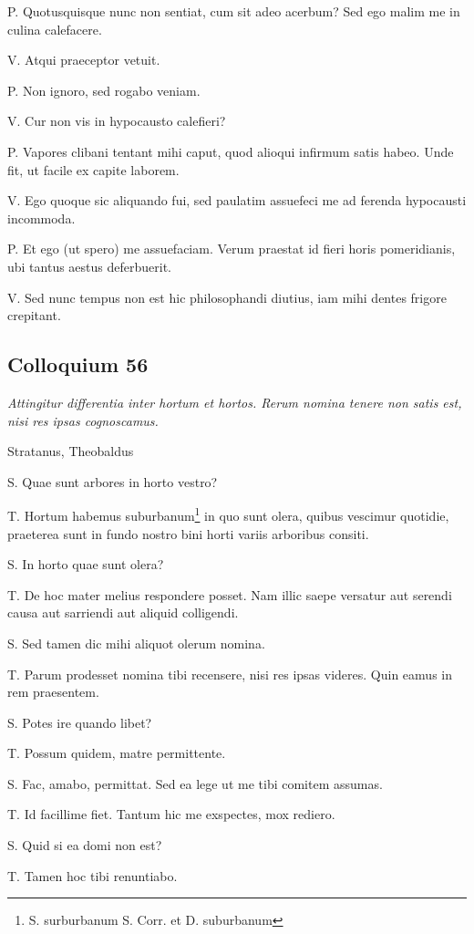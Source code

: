 \documentclass{article}
\begin{document}
P. Quotusquisque nunc non sentiat, cum sit adeo acerbum? Sed ego malim me in culina calefacere. 

V. Atqui praeceptor vetuit. 

P. Non ignoro, sed rogabo veniam. 

V. Cur non vis in hypocausto calefieri?

P. Vapores clibani tentant mihi caput, quod alioqui infirmum satis habeo. Unde fit, ut facile ex capite laborem. 

V. Ego quoque sic aliquando fui, sed paulatim assuefeci me ad ferenda hypocausti incommoda. 

P. Et ego (ut spero) me assuefaciam. Verum praestat id fieri horis pomeridianis, ubi tantus aestus deferbuerit. 

V. Sed nunc tempus non est hic philosophandi diutius, iam mihi dentes frigore crepitant.

\subsection{Colloquium 56}
\emph{Attingitur differentia inter hortum et hortos. Rerum nomina tenere non satis est, nisi res ipsas cognoscamus.}

Stratanus, Theobaldus

S. Quae sunt arbores in horto vestro?

T. Hortum habemus suburbanum\footnote{S. surburbanum S. Corr. et D. suburbanum} in quo sunt olera, quibus vescimur quotidie, praeterea sunt in fundo nostro bini horti variis arboribus consiti. 

S. In horto quae sunt olera?

T. De hoc mater melius respondere posset. Nam illic saepe versatur aut serendi causa aut sarriendi aut aliquid colligendi. 

S. Sed tamen dic mihi aliquot olerum nomina. 

T. Parum prodesset nomina tibi recensere, nisi res ipsas videres. Quin eamus in rem praesentem. 

S. Potes ire quando libet?

T. Possum quidem, matre permittente. 

S. Fac, amabo, permittat. Sed ea lege ut me tibi comitem assumas. 

T. Id facillime fiet. Tantum hic me exspectes, mox rediero. 

S. Quid si ea domi non est?

T. Tamen hoc tibi renuntiabo. 
\end{document}
